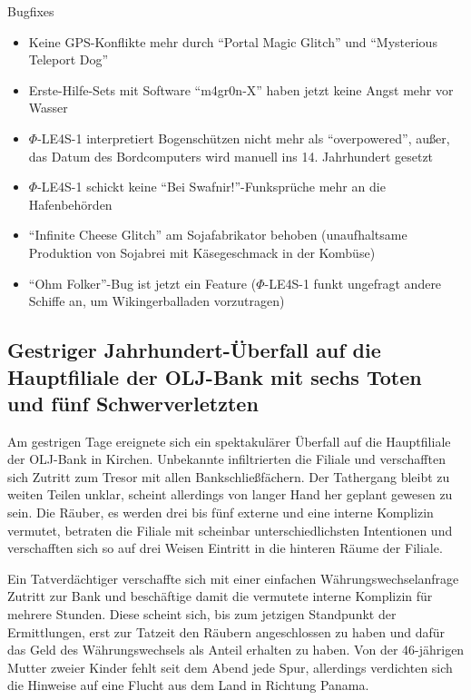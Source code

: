 \documentclass[final]{multiversum}
\begin{document}
\noindent Bugfixes
\begin{itemize}
    \item Keine GPS-Konflikte mehr durch \enquote{Portal Magic Glitch} und \enquote{Mysterious Teleport Dog}
    \item Erste-Hilfe-Sets mit Software \enquote{m4gr0n-X} haben jetzt keine Angst mehr
    vor Wasser
    \item $\Phi$-LE4S-1 interpretiert Bogenschützen nicht mehr als
    \enquote{overpowered}, außer, das Datum des Bordcomputers wird manuell ins 14.
    Jahrhundert gesetzt
    \item $\Phi$-LE4S-1 schickt keine \enquote{Bei Swafnir!}-Funksprüche mehr an die
    Hafenbehörden
    \item \enquote{Infinite Cheese Glitch} am Sojafabrikator behoben
    (unaufhaltsame Produktion von Sojabrei mit Käsegeschmack in der Kombüse)
    \item \enquote{Ohm Folker}-Bug ist jetzt ein Feature ($\Phi$-LE4S-1 funkt
    ungefragt andere Schiffe an, um Wikingerballaden vorzutragen)
\end{itemize} 

\subsection{Gestriger Jahrhundert-Überfall auf die Hauptfiliale der OLJ-Bank mit sechs Toten und fünf Schwerverletzten}
Am gestrigen Tage ereignete sich ein spektakulärer Überfall auf die Hauptfiliale
der OLJ-Bank in Kirchen. Unbekannte infiltrierten die Filiale und verschafften
sich Zutritt zum Tresor mit allen Bankschließfächern. Der Tathergang bleibt
zu weiten Teilen unklar, scheint allerdings von langer Hand her geplant
gewesen zu sein. Die Räuber, es werden drei bis fünf externe und eine interne Komplizin
vermutet, betraten die Filiale mit scheinbar unterschiedlichsten Intentionen und
verschafften sich so auf drei Weisen Eintritt in die hinteren Räume der Filiale.

Ein Tatverdächtiger verschaffte sich mit einer einfachen Währungswechselanfrage
Zutritt zur Bank und beschäftige damit die vermutete interne Komplizin für
mehrere Stunden. Diese scheint sich, bis zum jetzigen Standpunkt der
Ermittlungen, erst zur Tatzeit den Räubern angeschlossen zu haben und dafür das
Geld des Währungswechsels als Anteil erhalten zu haben. Von der 46-jährigen
Mutter zweier Kinder fehlt seit dem Abend jede Spur, allerdings verdichten sich
die Hinweise auf eine Flucht aus dem Land in Richtung Panama.
\end{document}
